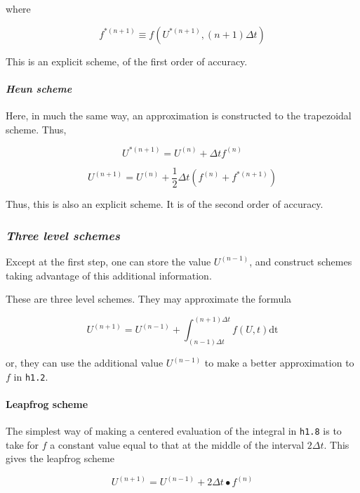 where

\[{f^{*\left( n + 1 \right)}} \equiv f\left( U^{*\left( n + 1 \right)}, \left( n + 1 \right)\Delta t \right)\]

This is an explicit scheme, of the first order of accuracy.

\paragraph{\texorpdfstring{\emph{Heun
scheme}}{Heun scheme}}\label{heun-scheme}

Here, in much the same way, an approximation is constructed to the
trapezoidal scheme. Thus,

{\[U^{*\left( n + 1 \right)} = U^{\left( n \right)} + \Delta t  f^{\left( n \right)}\]}

\[U^{\left( n + 1 \right)} = U^{\left( n \right)} + \frac{1}{2}\Delta t\left( f^{\left( n \right)} + f^{*\left( n + 1 \right)} \right)\]

Thus, this is also an explicit scheme. It is of the second order of
accuracy.

\subsubsection{\texorpdfstring{\emph{Three level
schemes}}{Three level schemes}}\label{three-level-schemes}

Except at the first step, one can store the value
\(U^{\left( n - 1 \right)}\), and construct schemes taking advantage of
this additional information.

These are three level schemes. They may approximate the formula

{\[U^{( n + 1 )} = U^{( n - 1 )} + \int_{( n - 1 )\Delta t}^{( n + 1 )\Delta t}f\left( U,t \right)\text{dt}\]}

or, they can use the additional value \(U^{\left( n - 1 \right)}\) to
make a better approximation to \(f\) in \texttt{h1.2}.

\paragraph{Leapfrog scheme}\label{leapfrog-scheme}

The simplest way of making a centered evaluation of the integral in
\texttt{h1.8} is to take for \(f\) a constant value equal to that at the
middle of the interval \(2\Delta t\). This gives the leapfrog scheme

{\[U^{\left( n + 1 \right)} = U^{\left( n - 1 \right)} + 2\Delta t \bullet f^{\left( n \right)}\]}


